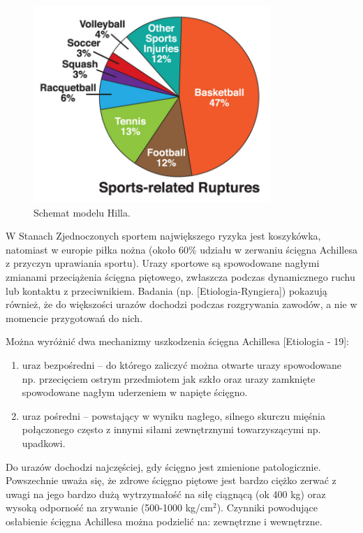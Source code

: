 \begin{figure}[h!]
	\centering
	\includegraphics[width=0.8\textwidth]{figures/Achilles_zerwanie.jpg}
	\caption{Schemat modelu Hilla.}
	\label{rupture}
\end{figure}

W Stanach Zjednoczonych sportem największego ryzyka jest koszykówka, natomiast w europie piłka nożna (około 60\% udziału w zerwaniu ścięgna Achillesa z przyczyn uprawiania sportu). Urazy sportowe są spowodowane nagłymi zmianami przeciążenia ścięgna piętowego, zwłaszcza podczas dynamicznego ruchu lub kontaktu z przeciwnikiem. Badania (np. [Etiologia-Ryngiera]) pokazują również, że do większości urazów dochodzi podczas rozgrywania zawodów, a nie w momencie przygotowań do nich. 

Można wyróżnić dwa mechanizmy uszkodzenia ścięgna Achillesa [Etiologia - 19]: 
\begin{enumerate}
	\item uraz bezpośredni -- do którego zaliczyć można otwarte urazy spowodowane np. przecięciem ostrym przedmiotem jak szkło oraz urazy zamknięte spowodowane nagłym uderzeniem w napięte ścięgno.
	\item uraz pośredni -- powstający w wyniku nagłego, silnego skurczu mięśnia połączonego często z innymi siłami zewnętrznymi towarzyszącymi np. upadkowi.
\end{enumerate}

Do urazów dochodzi najczęściej, gdy ścięgno jest zmienione patologicznie. Powszechnie uważa się, że zdrowe ścięgno piętowe jest bardzo ciężko zerwać z uwagi na jego bardzo dużą wytrzymałość na siłę ciągnącą (ok 400 kg) oraz wysoką odporność na zrywanie (500-1000 kg/cm$^2$). Czynniki powodujące osłabienie ścięgna Achillesa można podzielić na: zewnętrzne i wewnętrzne.

